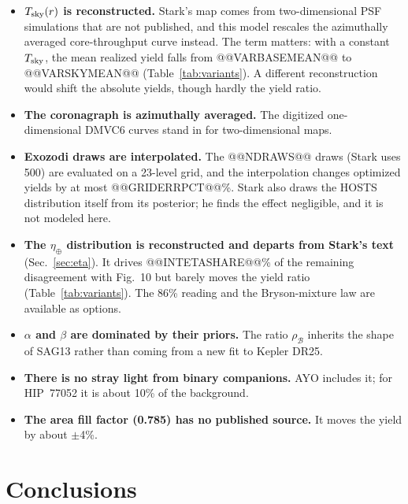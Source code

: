 \documentclass[11pt,a4paper]{article}
\begin{document}
\begin{itemize}
\item \textbf{$T_{\rm sky}(r)$ is reconstructed.} Stark's map comes from two-dimensional PSF
simulations that are not published, and this model rescales the azimuthally averaged
core-throughput curve instead. The term matters: with a constant $T_{\rm sky}$, the mean realized
yield falls from @@VARBASEMEAN@@ to @@VARSKYMEAN@@ (Table~\ref{tab:variants}). A different
reconstruction would shift the absolute yields, though hardly the yield ratio.
\item \textbf{The coronagraph is azimuthally averaged.} The digitized one-dimensional DMVC6 curves
stand in for two-dimensional maps.
\item \textbf{Exozodi draws are interpolated.} The @@NDRAWS@@ draws (Stark uses 500) are evaluated
on a 23-level grid, and the interpolation changes optimized yields by at most @@GRIDERRPCT@@\%.
Stark also draws the HOSTS distribution itself from its posterior; he finds the effect negligible,
and it is not modeled here.
\item \textbf{The $\eta_\oplus$ distribution is reconstructed and departs from Stark's text}
(Sec.~\ref{sec:eta}). It drives @@INTETASHARE@@\% of the remaining disagreement with Fig.~10 but
barely moves the yield ratio (Table~\ref{tab:variants}). The 86\% reading and the Bryson-mixture
law are available as options.
\item \textbf{$\alpha$ and $\beta$ are dominated by their priors.} The ratio $\rho_\mathcal{B}$
inherits the shape of SAG13 rather than coming from a new fit to Kepler DR25.
\item \textbf{There is no stray light from binary companions.} AYO includes it; for HIP~77052 it is
about 10\% of the background.
\item \textbf{The area fill factor (0.785) has no published source.} It moves the yield by about
$\pm$4\%.
\end{itemize}

\section{Conclusions}
\end{document}
